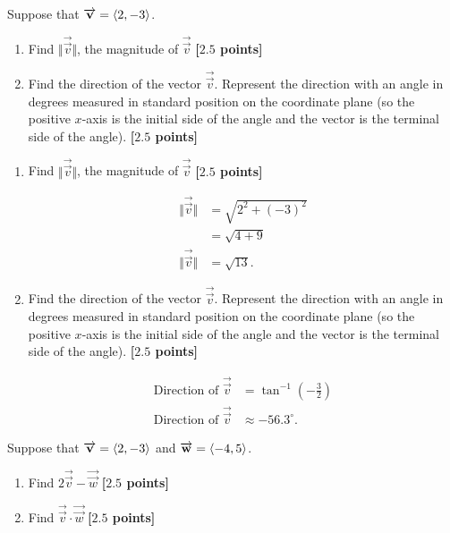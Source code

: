 \begin{problem}
  Suppose that $\overrightarrow{\mathbf{v}} = \braket{2,-3}$.

  \begin{enumerate}
    \item Find $\Vert \overrightarrow{\vec{v}} \Vert$, the magnitude of
      $\overrightarrow{\vec{v}}$ \textbf{[$2.5$ points]}
    \item  Find the direction of the vector $\overrightarrow{\vec{v}}$.
      Represent the direction with an angle in degrees measured in standard
      position on the coordinate plane (so the positive $x$-axis is the initial
      side of the angle and the vector is the terminal side of the angle).
      \textbf{[$2.5$ points]}
  \end{enumerate}
\end{problem}

\begin{solution}
  \begin{enumerate}
    \item Find $\Vert \overrightarrow{\vec{v}} \Vert$, the magnitude of
      $\overrightarrow{\vec{v}}$ \textbf{[$2.5$ points]}

      \begin{align*}
        \Vert \overrightarrow{\vec{v}} \Vert &= \sqrt{2^{2} + (-3)^{2}} \\
                                             &= \sqrt{4 + 9} \\
        \Vert \overrightarrow{\vec{v}} \Vert &= \sqrt{13}
      .\end{align*}
    \item  Find the direction of the vector $\overrightarrow{\vec{v}}$.
      Represent the direction with an angle in degrees measured in standard
      position on the coordinate plane (so the positive $x$-axis is the initial
      side of the angle and the vector is the terminal side of the angle).
      \textbf{[$2.5$ points]}

      \begin{align*}
        \textrm{Direction of } \overrightarrow{\vec{v}} &= \tan^{-1} \left(-\frac{3}{2}\right) \\
        \textrm{Direction of } \overrightarrow{\vec{v}} &\approx -56.3^{\circ}
      .\end{align*}
  \end{enumerate}
\end{solution}

\newpage

\begin{problem}
  Suppose that $\overrightarrow{\mathbf{v}} = \braket{2,-3}$ and
  $\overrightarrow{\mathbf{w}} = \braket{-4,5}$.

  \begin{enumerate}
    \item Find $2 \overrightarrow{\vec{v}} - \overrightarrow{\vec{w}}$
      \textbf{[$2.5$ points]}
    \item Find $\overrightarrow{\vec{v}} \cdot \overrightarrow{\vec{w}}$
      \textbf{[$2.5$ points]}
  \end{enumerate}
\end{problem}

